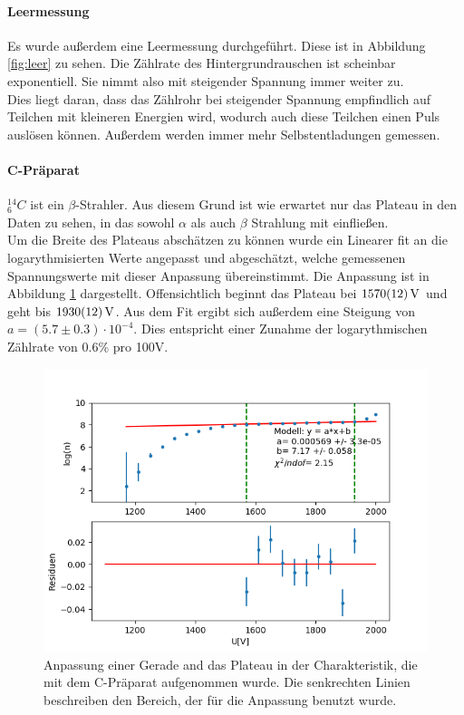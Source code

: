 \documentclass[12pt,a4paper]{article}
\begin{document}
\paragraph{Leermessung}
Es wurde außerdem eine Leermessung durchgeführt. Diese ist in Abbildung \ref{fig:leer} zu sehen. Die Zählrate des Hintergrundrauschen ist scheinbar exponentiell. Sie nimmt also mit steigender Spannung immer weiter zu.\\
Dies liegt daran, dass das Zählrohr bei steigender Spannung empfindlich auf Teilchen mit kleineren Energien wird, wodurch auch diese Teilchen einen Puls auslösen können. Außerdem werden immer mehr Selbstentladungen gemessen.

\paragraph{C-Präparat}
$_6^{14} C$ ist ein $\beta$-Strahler. Aus diesem Grund ist wie erwartet nur das Plateau in den Daten zu sehen, in das sowohl $\alpha$ als auch $\beta$ Strahlung mit einfließen.\\
Um die Breite des Plateaus abschätzen zu können wurde ein Linearer fit an die logarythmisierten Werte angepasst und abgeschätzt, welche gemessenen Spannungswerte  mit dieser Anpassung übereinstimmt. Die Anpassung ist in Abbildung \ref{fig:CPlateau} dargestellt. Offensichtlich beginnt das Plateau bei $\SI{1570\pm 12}{V}$ und geht bis $\SI{1930\pm 12}{V}$. Aus dem Fit ergibt sich außerdem eine Steigung von $a = (5.7\pm0.3)\cdot 10^{-4}$. Dies entspricht einer Zunahme der logarythmischen Zählrate von 0.6\% pro 100V.
\begin{figure}
\centering
\includegraphics[scale=0.8]{Bilder/Prop/C_plateau.PNG}
\caption{Anpassung einer Gerade and das Plateau in der Charakteristik, die mit dem C-Präparat aufgenommen wurde. Die senkrechten Linien beschreiben den Bereich, der für die Anpassung benutzt wurde.}
\label{fig:CPlateau}
\end{figure}\\
\end{document}
